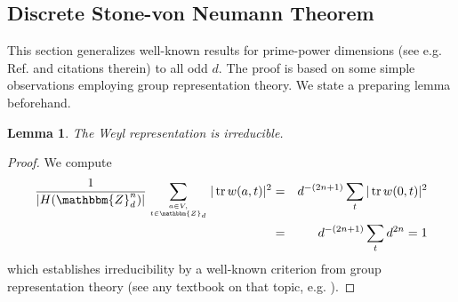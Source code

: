 \documentclass[aps,twocolumn,floatfix]{revtex4}
\newtheorem{lemma}[theorem]{Lemma}
\def\ZZ{\mathbbm{Z}}
\DeclareMathOperator{\tr}{tr}
\begin{document}
\subsection{Discrete Stone-von Neumann Theorem}
\label{scCliffordProof}

This section generalizes well-known results for prime-power dimensions
(see e.g. Ref. \cite{neuhauser} and citations therein) to all odd $d$.
The proof is based on some simple observations employing group
representation theory. We state a preparing lemma beforehand.

\begin{lemma} 
	The Weyl representation is irreducible.
\end{lemma}

\begin{proof}
	We compute
	\begin{eqnarray*}
		\frac1{|H(\ZZ_d^n)|} \sum_{{a\in V,}\atop{t\in \ZZ_d}} |\tr w(a,t)|^2 
		&=& d^{-(2n+1)} \sum_t |\tr w(0,t)|^2 \\
		&=& d^{-(2n+1)} \sum_t d^{2 n} = 1
	\end{eqnarray*}
	which establishes irreducibility by a well-known criterion from
	group representation theory (see any textbook on that topic, e.g.
	\cite{elementarygrouptheory}).
\end{proof}
\end{document}
